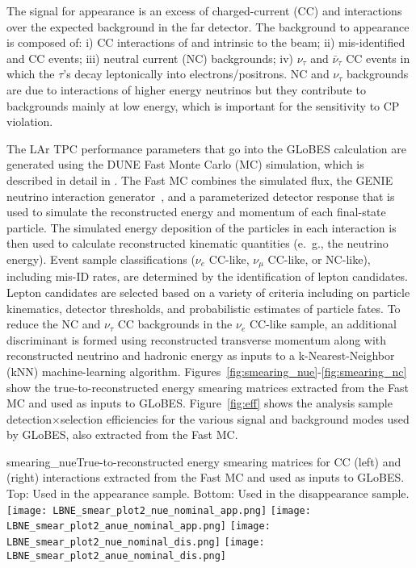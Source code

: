 The signal for \nue appearance is an excess of charged-current (CC) \nue and \anue interactions over the expected background in the far detector.  The background to \nue appearance is composed of: i) CC interactions of \nue and \anue intrinsic
to the beam; ii) mis-identified \numu and \anumu CC events; 
iii) neutral current (NC) backgrounds; iv) $\nu_\tau$ and $\bar{\nu}_\tau$ CC events 
in which the $\tau$'s decay leptonically into electrons/positrons. NC and $\nu_\tau$ 
backgrounds are due to interactions of higher energy neutrinos but they contribute to 
backgrounds mainly at low energy, which is important for the sensitivity to CP violation. 

The LAr TPC performance parameters that go into the GLoBES calculation are generated using the DUNE Fast Monte Carlo (MC) simulation, which is described in detail in \cite{Adams:2013qkq}.  The Fast MC combines the simulated flux, the GENIE neutrino interaction generator~\cite{Andreopoulos:2009rq}, and a parameterized detector response that is used to simulate the reconstructed energy and momentum of each final-state particle.  The simulated energy deposition of the particles in each interaction is then used to calculate reconstructed kinematic quantities (e.~g., the neutrino energy). Event sample classifications ($\nu_e$ CC-like, $\nu_{\mu}$ CC-like, or NC-like), including mis-ID rates, are determined by the identification of lepton candidates. Lepton candidates are selected based on a variety of criteria including on particle kinematics, detector thresholds, and probabilistic estimates of particle fates. To reduce the NC and $\nu_{\tau}$ CC backgrounds in the $\nu_e$ CC-like sample, an additional discriminant is formed using reconstructed transverse momentum along with reconstructed neutrino and hadronic energy as inputs to a k-Nearest-Neighbor (kNN) machine-learning algorithm.  Figures~\ref{fig:smearing_nue}-\ref{fig:smearing_nc} show the true-to-reconstructed energy smearing matrices extracted from the Fast MC and used as inputs to GLoBES.  Figure~\ref{fig:eff} shows the analysis sample detection$\times$selection efficiencies for the various signal and background modes used by GLoBES, also extracted from the Fast MC.

\begin{cdrfigure}{smearing_nue}{True-to-reconstructed energy smearing matrices for CC \nue (left) and \anue (right) interactions extracted from the Fast MC and used as inputs to GLoBES.  Top: Used in the appearance sample.  Bottom: Used in the disappearance sample.}
 \texttt{[image: LBNE\_smear\_plot2\_nue\_nominal\_app.png]}
 \texttt{[image: LBNE\_smear\_plot2\_anue\_nominal\_app.png]}
 \texttt{[image: LBNE\_smear\_plot2\_nue\_nominal\_dis.png]}
 \texttt{[image: LBNE\_smear\_plot2\_anue\_nominal\_dis.png]}
\end{cdrfigure}

